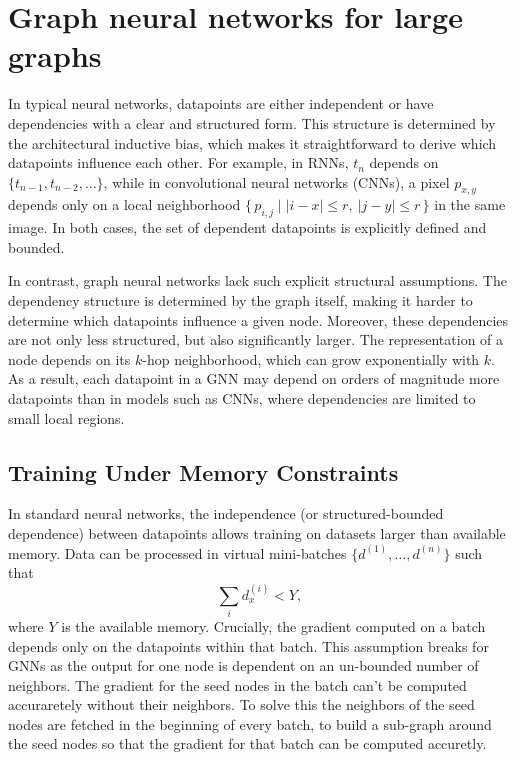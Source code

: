 \documentclass[ oneside,openright,titlepage,numbers=noenddot,headinclude,%
                footinclude=true,cleardoublepage=empty,abstractoff, %
                BCOR=0mm,paper=a4,fontsize=11pt,%
                ngerman,american,%
                ]{scrreprt}
\begin{document}
\section{Graph neural networks for large graphs}

In typical neural networks, datapoints are either independent or have dependencies with a clear and structured form. This structure is determined by the architectural inductive bias, which makes it straightforward to derive which datapoints influence each other. For example, in RNNs, $t_n$ depends on $\{t_{n-1}, t_{n-2}, \dots\}$, while in convolutional neural networks (CNNs), a pixel $p_{x,y}$ depends only on a local neighborhood $\{\,p_{i,j} \mid |i-x| \le r,\ |j-y| \le r \,\}$ in the same image.
In both cases, the set of dependent datapoints is explicitly defined and bounded.

In contrast, graph neural networks lack such explicit structural assumptions. The dependency structure is determined by the graph itself, making it harder to determine which datapoints influence a given node. Moreover, these dependencies are not only less structured, but also significantly larger. The representation of a node depends on its $k$-hop neighborhood, which can grow exponentially with $k$. As a result, each datapoint in a GNN may depend on orders of magnitude more datapoints than in models such as CNNs, where dependencies are limited to small local regions.


\subsection{Training Under Memory Constraints}

In standard neural networks, the independence (or structured-bounded dependence) between datapoints allows training on datasets larger than available memory. Data can be processed in virtual mini-batches $\{d^{(1)}, \dots, d^{(n)}\}$ such that
\[
\sum_i d^{(i)}_x < Y,
\]
where $Y$ is the available memory. Crucially, the gradient computed on a batch depends only on the datapoints within that batch. This assumption breaks for GNNs as the output for one node is dependent on an un-bounded number of neighbors. The gradient for the seed nodes in the batch can't be computed accuraretely without their neighbors. To solve this the neighbors of the seed nodes are fetched in the beginning of every batch, to build a sub-graph around the seed nodes so that the gradient for that batch can be computed accuretly.
\end{document}
